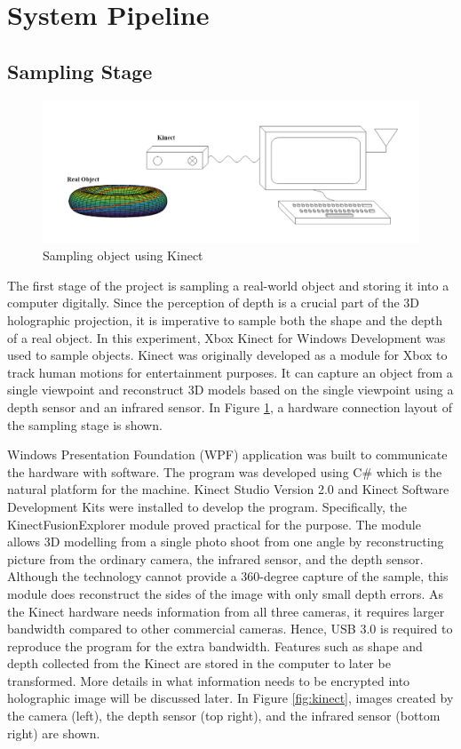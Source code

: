 \documentclass[12pt]{article}
\begin{document}
\newpage
\section{System Pipeline}

\subsection{Sampling Stage}

\begin{figure}
    \centering
    \includegraphics[width=\textwidth]{sampling}
    \caption{Sampling object using Kinect}
    \label{fig:Sampling}
\end{figure}

\qquad
The first stage of the project is sampling a real-world object and storing it into a computer digitally. Since the perception of depth is a crucial part of the 3D holographic projection, it is imperative to sample both the shape and the depth of a real object. In this experiment, Xbox Kinect for Windows Development was used to sample objects. Kinect was originally developed as a module for Xbox to track human motions for entertainment purposes. It can capture an object from a single viewpoint and reconstruct 3D models based on the single viewpoint using a depth sensor and an infrared sensor. In Figure \ref{fig:Sampling}, a hardware connection layout of the sampling stage is shown.

Windows Presentation Foundation (WPF) application was built to communicate the hardware with software. The program was developed using C\# which is the natural platform for the machine. Kinect Studio Version 2.0 and Kinect Software Development Kits were installed to develop the program. Specifically, the KinectFusionExplorer module proved practical for the purpose. The module allows 3D modelling from a single photo shoot from one angle by reconstructing picture from the ordinary camera, the infrared sensor, and the depth sensor. Although the technology cannot provide a 360-degree capture of the sample, this module does reconstruct the sides of the image with only small depth errors. As the Kinect hardware needs information from all three cameras, it requires larger bandwidth compared to other commercial cameras. Hence, USB 3.0 is required to reproduce the program for the extra bandwidth. Features such as shape and depth collected from the Kinect are stored in the computer to later be transformed. More details in what information needs to be encrypted into holographic image will be discussed later. In Figure \ref{fig:kinect}, images created by the camera (left), the depth sensor (top right), and the infrared sensor (bottom right) are shown.
\end{document}
